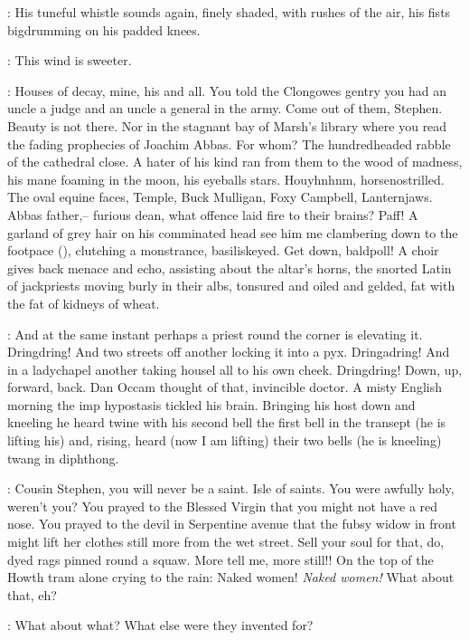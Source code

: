 :
His tuneful whistle sounds again, finely shaded,
with rushes of the air,
his fists bigdrumming on his padded knees.

\StephenInt:
This wind is sweeter.

\StephenInt:
Houses of decay, mine, his and all.
You told the Clongowes gentry
you had an uncle a judge
and an uncle a general in the army.
Come out of them, Stephen.
Beauty is not there.
Nor in the stagnant bay of Marsh's library
where you read the fading prophecies of Joachim Abbas.
For whom?
The hundredheaded rabble of the cathedral close.
A hater of his kind ran from them to the wood of madness,
his mane foaming in the moon, his eyeballs stars.
Houyhnhnm, horsenostrilled.
The oval equine faces,
Temple, Buck Mulligan, Foxy Campbell, Lanternjaws.
Abbas father,--
furious dean, what offence laid fire to their brains?
Paff!
A garland of grey hair on his comminated head
see him me clambering down to the footpace (),
clutching a monstrance, basiliskeyed.
Get down, baldpoll!
A choir gives back menace and echo,
assisting about the altar's horns,
the snorted Latin of jackpriests
moving burly in their albs,
tonsured and oiled and gelded,
fat with the fat of kidneys of wheat.

\StephenInt:
And at the same instant
perhaps a priest round the corner is elevating it.
Dringdring!
And two streets off
another locking it into a pyx.
Dringadring!
And in a ladychapel
another taking housel all to his own cheek.
Dringdring!
Down, up, forward, back.
Dan Occam thought of that,
invincible doctor.
A misty English morning
the imp hypostasis tickled his brain.
Bringing his host down and kneeling
he heard twine with his second bell
the first bell in the transept
(he is lifting his)
and, rising, heard
(now I am lifting)
their two bells
(he is kneeling)
twang in diphthong.

\StephenInt:
Cousin Stephen, you will never be a saint.
Isle of saints.
You were awfully holy, weren't you?
You prayed to the Blessed Virgin
that you might not have a red nose.
You prayed to the devil in Serpentine avenue
that the fubsy widow in front might lift her clothes
still more from the wet street.
Sell your soul for that, do, dyed rags pinned round a squaw.
More tell me, more still!!
On the top of the Howth tram alone crying to the rain:
Naked women!
\emph{Naked women!}
What about that, eh?

\StephenInt:
What about what?
What else were they invented for?

